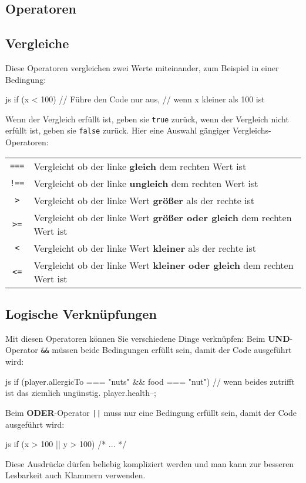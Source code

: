 \documentclass[10pt,a4paper]{article}
\begin{document}
\begin{multicols}{3}
\section*{Operatoren}
\subsection*{Vergleiche}
Diese Operatoren vergleichen zwei Werte miteinander, zum Beispiel in einer Bedingung:
\begin{codebox}{js}{}
  if (x < 100) {
    // Führe den Code nur aus,
    // wenn x kleiner als 100 ist
  }
\end{codebox}
Wenn der Vergleich erfüllt ist, geben sie \texttt{true} zurück, wenn der Vergleich nicht erfüllt ist, geben sie \texttt{false} zurück. Hier eine Auswahl gängiger Vergleichs-Operatoren:

\vspace{0.5cm}
\begin{tabular}{c l}
  \texttt{===} & Vergleicht ob der linke \textbf{gleich} dem rechten Wert ist \\
  \texttt{!==} & Vergleicht ob der linke \textbf{ungleich} dem rechten Wert ist \\
  \texttt{>} & Vergleicht ob der linke Wert \textbf{größer} als der rechte ist \\
  \texttt{>=} & Vergleicht ob der linke Wert \textbf{größer oder gleich} dem rechten Wert ist \\
  \texttt{<} & Vergleicht ob der linke Wert \textbf{kleiner} als der rechte ist \\
  \texttt{<=} & Vergleicht ob der linke Wert \textbf{kleiner oder gleich} dem rechten Wert ist \\
\end{tabular}

\subsection*{Logische Verknüpfungen}
Mit diesen Operatoren können Sie verschiedene Dinge verknüpfen:
Beim \textbf{UND}-Operator \texttt{\&\&} müssen beide Bedingungen erfüllt sein, damit der Code ausgeführt wird:
\begin{codebox}{js}{}
  if (player.allergicTo === "nuts" && food === "nut") {
    // wenn beides zutrifft ist das ziemlich ungünstig.
    player.health--;
  }
\end{codebox}
Beim \textbf{ODER}-Operator \texttt{||} muss nur eine Bedingung erfüllt sein, damit der Code ausgeführt wird:
\begin{codebox}{js}{}
  if (x > 100 || y > 100) {
    /* ... */
  }
\end{codebox}
Diese Ausdrücke dürfen beliebig kompliziert werden und man kann zur besseren Lesbarkeit auch Klammern verwenden.


\end{multicols}
\end{document}
